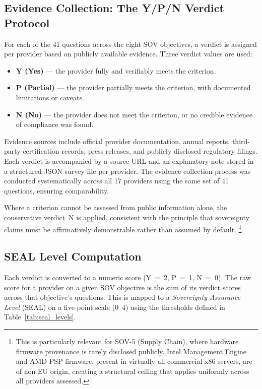 \subsection{Evidence Collection: The Y/P/N Verdict Protocol}
\label{subsec:ypn_verdicts}

For each of the 41 questions across the eight SOV objectives, a verdict is assigned per provider based on publicly available evidence. Three verdict values are used:

\begin{itemize}
  \item \textbf{Y (Yes)} — the provider fully and verifiably meets the criterion.
  \item \textbf{P (Partial)} — the provider partially meets the criterion, with documented limitations or caveats.
  \item \textbf{N (No)} — the provider does not meet the criterion, or no credible evidence of compliance was found.
\end{itemize}

Evidence sources include official provider documentation, annual reports, third-party certification records, press releases, and publicly disclosed regulatory filings. Each verdict is accompanied by a source URL and an explanatory note stored in a structured JSON survey file per provider. The evidence collection process was conducted systematically across all 17 providers using the same set of 41 questions, ensuring comparability.

Where a criterion cannot be assessed from public information alone, the conservative verdict~N is applied, consistent with the principle that sovereignty claims must be affirmatively demonstrable rather than assumed by default.%
\footnote{This is particularly relevant for SOV-5 (Supply Chain), where hardware firmware provenance is rarely disclosed publicly. Intel Management Engine and AMD PSP firmware, present in virtually all commercial x86 servers, are of non-EU origin, creating a structural ceiling that applies uniformly across all providers assessed.}

\subsection{SEAL Level Computation}
\label{subsec:seal_computation}

Each verdict is converted to a numeric score (Y~=~2, P~=~1, N~=~0). The raw score for a provider on a given SOV objective is the sum of its verdict scores across that objective's questions. This is mapped to a \textit{Sovereignty Assurance Level} (SEAL) on a five-point scale (0--4) using the thresholds defined in Table~\ref{tab:seal_levels}.

